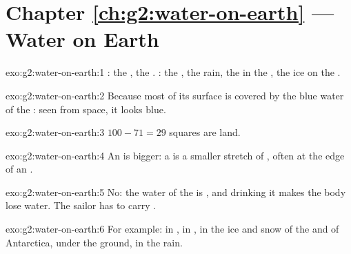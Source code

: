 \section*{Chapter \ref{ch:g2:water-on-earth} --- Water on Earth}

\begin{solution}{exo:g2:water-on-earth:1}
: the , the . : the , the rain, the 
in the , the ice on the .
\end{solution}

\begin{solution}{exo:g2:water-on-earth:2}
Because most of its surface is covered by the blue water of the :
seen from space, it looks blue.
\end{solution}

\begin{solution}{exo:g2:water-on-earth:3}
$100 - 71 = 29$ squares are land.
\end{solution}

\begin{solution}{exo:g2:water-on-earth:4}
An  is bigger: a  is a smaller stretch of , often at the
edge of an .
\end{solution}

\begin{solution}{exo:g2:water-on-earth:5}
No: the water of the  is , and drinking it makes the body
lose water. The sailor has to carry .
\end{solution}

\begin{solution}{exo:g2:water-on-earth:6}
For example: in , in , in the ice and snow of the  and
of Antarctica, under the ground, in the rain.
\end{solution}

